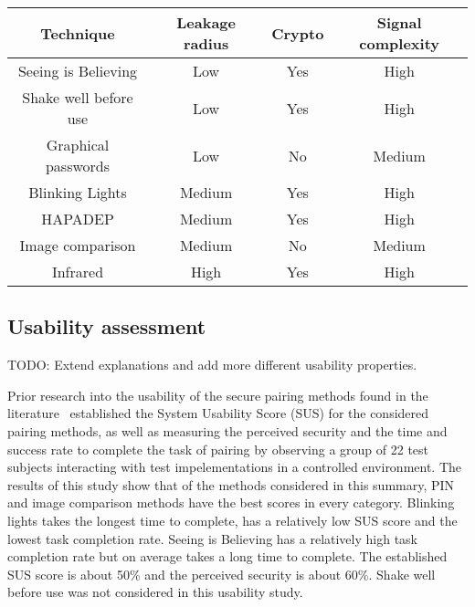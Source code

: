 \documentclass[conference, 12pt]{sty/IEEEtran}
\begin{document}
\begin{footnotesize}
\begin{tabular}{c|c|c|c}
	Technique & Leakage radius & Crypto & Signal complexity \\
	\hline
	  Seeing is Believing & Low & Yes & High \\
	Shake well before use & Low & Yes & High \\
    	  Graphical passwords & Low & No & Medium \\
  Blinking Lights & Medium & Yes & High \\
	 HAPADEP & Medium & Yes & High \\
	Image comparison & Medium & No & Medium\\
	Infrared & High & Yes & High \\
\end{tabular}
\end{footnotesize}


\subsection{Usability assessment}
\label{ssec:usability_assessment}

TODO: Extend explanations and add more different usability properties.

Prior research into the usability of the secure pairing methods found in the literature~\cite{kumar2009comparative} established the System Usability Score (SUS) for the considered pairing methods, as well as measuring the perceived security and the time and success rate to complete the task of pairing by observing a group of 22 test subjects interacting with test impelementations in a controlled environment.
The results of this study show that of the methods considered in this summary, PIN and image comparison methods have the best scores in every category.
Blinking lights takes the longest time to complete, has a relatively low SUS score and the lowest task completion rate.
Seeing is Believing has a relatively high task completion rate but on average takes a long time to complete.
The established SUS score is about 50\% and the perceived security is about 60\%.
Shake well before use was not considered in this usability study.
\end{document}
